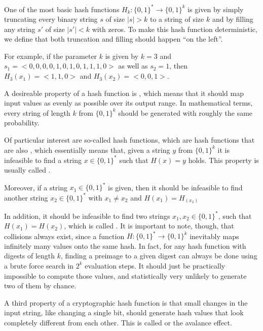 \begin{example}\label{ex:k-truncation-hash} One of the most basic hash functions $H_k:\{0,1\}^*\to \{0,1\}^k$ is given by simply truncating every binary string $s$ of size $|s|> k$ to a string of size $k$ and by filling any string $s'$ of size $|s'|<k$ with zeros. To make this hash function deterministic, we define that both truncation and filling should happen ``on the left''.

For example, if the parameter $k$ is given by $k=3$ and $s_1=<0,0,0,0,1,0,1,0,1,1,1,0>$ as well as $s_2=1$, then $H_3(x_1)=<1,1,0>$ and $H_3(x_2)=<0,0,1>$.
\end{example}

A desireable property of a hash function is , which means that it should map input values as evenly as possible over its output range. In mathematical terms, every string of length $k$  from $\{0,1\}^k$ should be generated with roughly the same probability.

Of particular interest are so-called  hash functions, which are hash functions that are also , which essentially means that, given a string $y$ from $\{0,1\}^k$ it is infeasible to find a string $x\in\{0,1\}^*$ such that $H(x)=y$ holds. This property is usually called .

Moreover, if a string $x_1\in\{0,1\}^*$ is given, then it should be infeasible to find another string $x_2\in\{0,1\}^*$ with $x_1\neq x_2$ and $H(x_1)=H_(x_2)$

In addition, it should be infeasible to find two strings $x_1,x_2 \in\{0,1\}^*$, such that $H(x_1)=H(x_2)$, which is called . It is important to note, though, that collisions always exist, since a function $H: \{0,1\}^* \to \{0,1\}^k$ inevitably maps infinitely many values onto the same hash. In fact, for any hash function with digests of length $k$, finding a preimage to a given digest can always be done using a brute force search in $2^k$ evaluation steps. It should just be practically impossible to compute those values, and statistically very unlikely to generate two of them by chance.

A third property of a cryptographic hash function is that small changes in the input string, like changing a single bit, should generate hash values that look completely different from each other. This is called  or the avalance effect.

